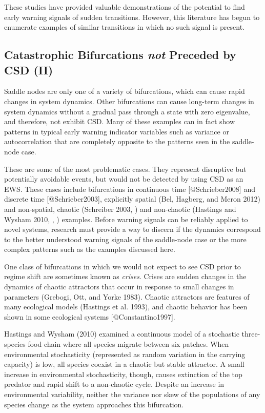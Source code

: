 \documentclass[author-year, review]{elsarticle} %
\begin{document}
These studies have provided valuable demonstrations of the potential to
find early warning signals of sudden transitions. However, this
literature has begun to enumerate examples of similar transitions in
which no such signal is present.

\subsection{Catastrophic Bifurcations \emph{not} Preceded by CSD (II)}

Saddle nodes are only one of a variety of bifurcations, which can cause
rapid changes in system dynamics. Other bifurcations can cause long-term
changes in system dynamics without a gradual pass through a state with
zero eigenvalue, and therefore, not exhibit CSD. Many of these examples
can in fact show patterns in typical early warning indicator variables
such as variance or autocorrelation that are completely opposite to the
patterns seen in the saddle-node case.

These are some of the most problematic cases. They represent disruptive
but potentially avoidable events, but would not be detected by using CSD
as an EWS. These cases include bifurcations in continuous time
{[}@Schrieber2008{]} and discrete time {[}@Schrieber2003{]}, explicitly
spatial (Bel, Hagberg, and Meron 2012) and non-spatial, chaotic
(Schreiber 2003, ) and non-chaotic (Hastings and Wysham 2010, , )
examples. Before warning signals can be reliably applied to novel
systems, research must provide a way to discern if the dynamics
correspond to the better understood warning signals of the saddle-node
case or the more complex patterns such as the examples discussed here.

One class of bifurcations in which we would not expect to see CSD prior
to regime shift are sometimes known as \emph{crises}. Crises are sudden
changes in the dynamics of chaotic attractors that occur in response to
small changes in parameters (Grebogi, Ott, and Yorke 1983). Chaotic
attractors are features of many ecological models (Hastings et al.
1993), and chaotic behavior has been shown in some ecological systems
{[}@Constantino1997{]}.

Hastings and Wysham (2010) examined a continuous model of a stochastic
three-species food chain where all species migrate between six patches.
When environmental stochasticity (represented as random variation in the
carrying capacity) is low, all species coexist in a chaotic but stable
attractor. A small increase in environmental stochasticity, though,
causes extinction of the top predator and rapid shift to a non-chaotic
cycle. Despite an increase in environmental variability, neither the
variance nor skew of the populations of any species change as the system
approaches this bifurcation.
\end{document}
